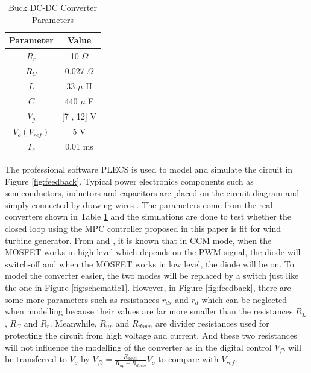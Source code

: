 \documentclass[journal]{IEEEtran}
\begin{document}
\begin{table}[h]
	\caption{Buck DC-DC Converter Parameters}\label{tabparam}
	\begin{center}
		\begin{tabular}{c|c }
			\hline
			\hline
			Parameter & Value  \\
			\hline
			$R_r$ & 10 $\Omega $ \\
			\hline
			$R_C$ & 0.027 $\Omega $\\
			\hline
			$L$ & 33 $\mu$ H\\
			\hline
			$C$& 440 $\mu$ F\\
			\hline
			$V_g$&[7 , 12] V\\
			\hline
			$V_o (V_{ref})$& 5 V\\
			\hline
			$T_s$ & 0.01 ms\\
			\hline
			\hline
		\end{tabular}
	\end{center}
\end{table}







The professional software PLECS is used to model and simulate the circuit in Figure \ref{fig:feedback}. Typical power electronics components such as semiconductors, inductors and capacitors are placed on the circuit diagram and simply connected by drawing wires \cite{alimeling1999plecs}. The parameters come from the real converters shown in Table \ref{tabparam} and the simulations are done to test whether the closed loop using the MPC controller proposed in this paper is fit for wind turbine generator. From \cite{middlebrook1976general} and \cite{middlebrook1977general}, it is known that in CCM mode, when the MOSFET works in high level which depends on the PWM signal, the diode will switch-off and when the MOSFET works in low level, the diode will be on. To model the converter easier, the two modes will be replaced by a switch just like the one in Figure \ref{fig:schematic1}. However, in Figure \ref{fig:feedback}, there are some more parameters such as resistances $r_{ds}$ and $r_d$ which can be neglected when modelling because their values are far more smaller than the resistances $R_L$, $R_C$ and $R_r$. Meanwhile, $R_{up}$ and $R_{down}$ are divider resistances used for protecting the circuit from high voltage and current. And these two resistances will not influence the modelling of the converter as in the digital control $V_{fb}$ will be transferred to $V_o$ by ${V_{fb}} = \frac{{{R_{down}}}}{{{R_{up}} + {R_{down}}}}{V_o}$ to compare with $V_{ref}$.
\end{document}
